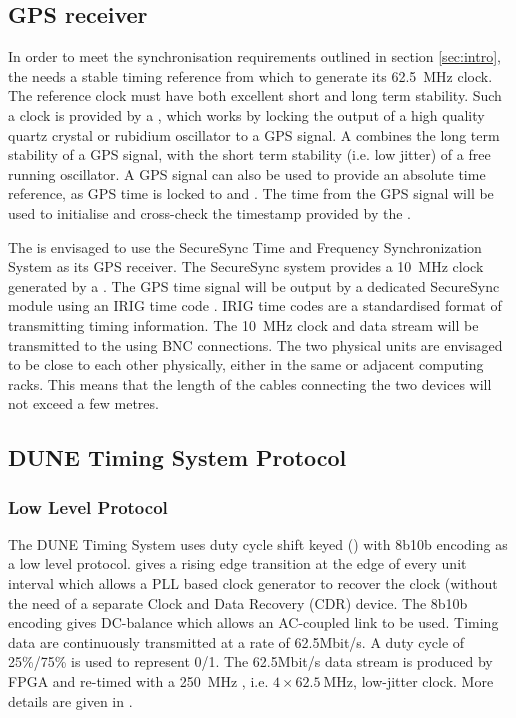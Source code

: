 \documentclass[main.tex]{subfiles}
\begin{document}
\subsection{GPS receiver}
In order to meet the synchronisation requirements outlined in section \ref{sec:intro}, the  needs a stable timing reference from which to generate its \SI{62.5}{\MHz} clock. The reference clock must have both excellent short and long term stability. Such a clock is provided by a , which works by locking the output of a high quality quartz crystal or rubidium oscillator to a GPS signal. A  combines the long term stability of a GPS signal, with the short term stability (i.e. low jitter) of a free running oscillator. A GPS signal can also be used to provide an absolute time reference, as GPS time is locked to  and . The time from the GPS signal will be used to initialise and cross-check the timestamp provided by the .

The  is envisaged to use the SecureSync Time and Frequency Synchronization System \cite{secure_sync_datasheet} as its GPS receiver. The SecureSync system provides a \SI{10}{\MHz} clock generated by a . The GPS time signal will be output by a dedicated SecureSync module \cite{secure_sync_modules} using an IRIG time code \cite{irig}. IRIG time codes are a standardised format of transmitting timing information. The \SI{10}{\MHz} clock and  data stream will be transmitted to the  using BNC connections. The two physical units are envisaged to be close to each other physically, either in the same or adjacent computing racks. This means that the length of the cables connecting the two devices will not exceed a few metres.

\subsection{DUNE Timing System Protocol}

\subsubsection{Low Level Protocol}

The DUNE Timing System uses duty cycle shift keyed () with 8b10b encoding as a low level protocol.   gives a rising edge transition at the edge of every unit interval which allows a PLL based clock generator to recover the clock (without the need of a separate Clock and Data Recovery (CDR) device. The 8b10b encoding gives DC-balance which allows an AC-coupled link to be used. Timing data are continuously transmitted at a rate of 62.5Mbit/s. A duty cycle of 25\%/75\% is used to represent 0/1. The 62.5Mbit/s data stream is produced by FPGA and re-timed with a \SI{250}{MHz} , i.e. $4 \times \SI{62.5}{\MHz}$, low-jitter clock. More details are given in \cite{2210.15517}. 
\end{document}

